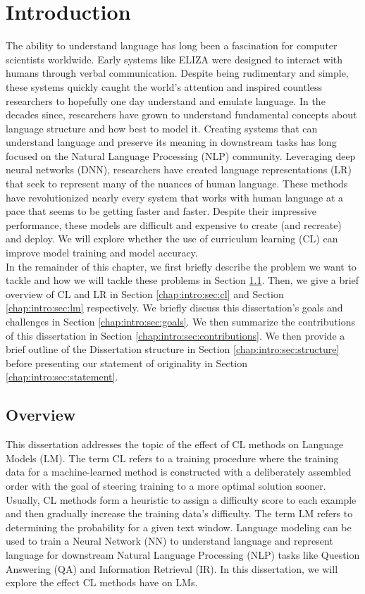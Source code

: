 \chapter {Introduction}
\label{chap:intro:sec:intro}
The ability to understand language has long been a fascination for computer scientists worldwide. Early systems like ELIZA \cite{Weizenbaum1966ELIZAA} were designed to interact with humans through verbal communication. Despite being rudimentary and simple, these systems quickly caught the world's attention and inspired countless researchers to hopefully one day understand and emulate language.  In the decades since, researchers have grown to understand fundamental concepts about language structure and how best to model it. Creating systems that can understand language and preserve its meaning in downstream tasks has long focused on the Natural Language Processing (NLP) community. Leveraging deep neural networks (DNN), researchers have created language representations (LR) that seek to represent many of the nuances of human language. These methods have revolutionized nearly every system that works with human language at a pace that seems to be getting faster and faster. Despite their impressive performance, these models are difficult and expensive to create (and recreate) and deploy. We will explore whether the use of curriculum learning (CL) can improve model training and model accuracy.\\
In the remainder of this chapter, we first briefly describe the problem we want to tackle and how we will tackle these problems in Section \ref{chap:intro:sec:overview}. Then, we give a brief overview of CL and LR in Section \ref{chap:intro:sec:cl} and Section \ref{chap:intro:sec:lm} respectively. We briefly discuss this dissertation's goals and challenges in Section \ref{chap:intro:sec:goals}. We then summarize the contributions of this dissertation in Section \ref{chap:intro:sec:contributions}. We then provide a brief outline of the Dissertation structure in Section \ref{chap:intro:sec:structure} before presenting our statement of originality in Section \ref{chap:intro:sec:statement}.
\section{Overview}
\label{chap:intro:sec:overview}
This dissertation addresses the topic of the effect of CL methods on Language Models (LM). The term CL refers to a training procedure where the training data for a machine-learned method is constructed with a deliberately assembled order with the goal of steering training to a more optimal solution sooner. Usually, CL methods form a heuristic to assign a difficulty score to each example and then gradually increase the training data's difficulty. The term LM refers to determining the probability for a given text window. Language modeling can be used to train a Neural Network (NN) to understand language and represent language for downstream Natural Language Processing (NLP) tasks like Question Answering (QA) and Information Retrieval (IR). In this dissertation, we will explore the effect CL methods have on LMs.

